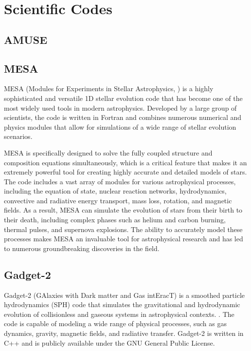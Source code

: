 \section{Scientific Codes}

\subsection{AMUSE}



\subsection{MESA}

MESA (Modules for Experiments in Stellar Astrophysics, \cite{paxton2010modules,paxton2013modules,paxton2015modules,paxton2019modules}) is a highly sophisticated and versatile 1D stellar evolution code that has become one of the most widely used tools in modern astrophysics. Developed by a large group of scientists, the code is written in Fortran and combines numerous numerical and physics modules that allow for simulations of a wide range of stellar evolution scenarios.

MESA is specifically designed to solve the fully coupled structure and composition equations simultaneously, which is a critical feature that makes it an extremely powerful tool for creating highly accurate and detailed models of stars. The code includes a vast array of modules for various astrophysical processes, including the equation of state, nuclear reaction networks, hydrodynamics, convective and radiative energy transport, mass loss, rotation, and magnetic fields. As a result, MESA can simulate the evolution of stars from their birth to their death, including complex phases such as helium and carbon burning, thermal pulses, and supernova explosions. The ability to accurately model these processes makes MESA an invaluable tool for astrophysical research and has led to numerous groundbreaking discoveries in the field.



\subsection{Gadget-2}

Gadget-2 (GAlaxies with Dark matter and Gas intEracT) is a smoothed particle hydrodynamics (SPH) code that simulates the gravitational and hydrodynamic evolution of collisionless and gaseous systems in astrophysical contexts. \citep{springel2005cosmological}. The code is capable of modeling a wide range of physical processes, such as gas dynamics, gravity, magnetic fields, and radiative transfer. Gadget-2 is written in C++ and is publicly available under the GNU General Public License.

